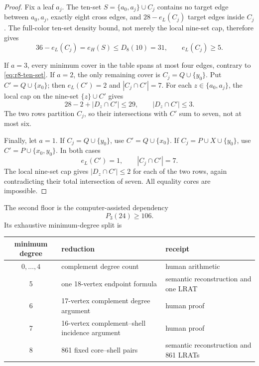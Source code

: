 \documentclass[11pt,reqno,a4paper]{amsart}
\theoremstyle{definition}
\theoremstyle{remark}
\begin{document}
\begin{proof}
Fix a leaf $a_j$. The ten-set
$S=\{a_0,a_j\}\cup C_j$ contains no target edge between $a_0,a_j$,
exactly eight cross edges, and $28-e_L(C_j)$ target edges inside $C_j$.
The full-color ten-set density bound, not merely the local nine-set cap,
therefore gives
\begin{equation}\label{eq:r8-ten-set}
 36-e_L(C_j)=e_H(S)\leq D_8(10)=31,
 \qquad e_L(C_j)\geq5.
\end{equation}

If $a=3$, every minimum cover in the table spans at most four edges,
contrary to \eqref{eq:r8-ten-set}. If $a=2$, the only remaining cover is
$C_j=Q\cup\{y_0\}$. Put $C'=Q\cup\{x_0\}$; then
$e_L(C')=2$ and $|C_j\cap C'|=7$. For each
$z\in\{a_0,a_j\}$, the local cap on the nine-set $\{z\}\cup C'$ gives
\[
 28-2+|D_z\cap C'|\leq29,
 \qquad |D_z\cap C'|\leq3.
\]
The two rows partition $C_j$, so their intersections with $C'$ sum to
seven, not at most six.

Finally, let $a=1$. If $C_j=Q\cup\{y_0\}$, use
$C'=Q\cup\{x_0\}$. If $C_j=P\cup X\cup\{y_0\}$, use
$C'=P\cup\{x_0,y_0\}$. In both cases
\[
 e_L(C')=1,
 \qquad |C_j\cap C'|=7.
\]
The local nine-set cap gives $|D_z\cap C'|\leq2$ for each of the two
rows, again contradicting their total intersection of seven. All equality
cores are impossible.
\end{proof}

The second floor is the computer-assisted dependency
\begin{equation}\label{eq:r8-p324}
  P_3(24)\geq106.
\end{equation}
Its exhaustive minimum-degree split is
\begin{center}
\small
\begin{tabular}{c p{}p{}}
\toprule
minimum degree&reduction&receipt\\
\midrule
$0,\ldots,4$&complement degree count&human arithmetic\\
5&one 18-vertex endpoint formula&semantic reconstruction and one LRAT\\
6&17-vertex complement degree argument&human proof\\
7&16-vertex complement--shell incidence argument&human proof\\
8&861 fixed core--shell pairs&semantic reconstruction and 861 LRATs\\
\bottomrule
\end{tabular}
\end{center}
\end{document}
